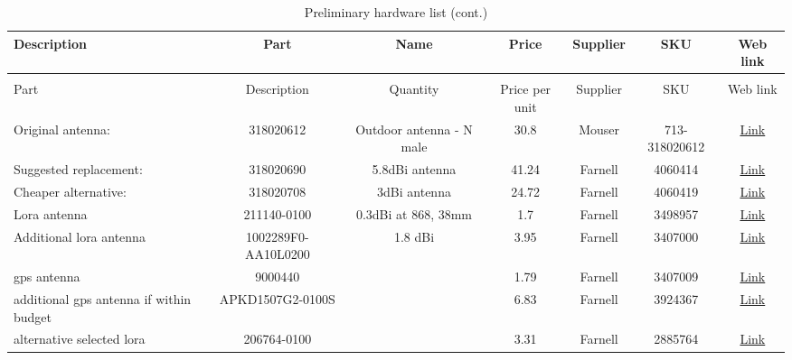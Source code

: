 \begin{appendices}
\begin{landscape}
\begin{xltabular}{\linewidth}{|cYccccc|}
    \end{xltabular}

    \begin{xltabular}{\linewidth}{|Ycccccc|}
        \caption{Antennae list} \label{table:antennaelist} \\
        \hline

        Description & Part & Name  & Price & Supplier & SKU & Web link \\
        \endfirsthead

        \caption{Preliminary hardware list (cont.)}\\
        \hline
        Part & Description & Quantity  & Price per unit & Supplier & SKU & Web link \\
        \endhead
        \endfoot

        \hline
        Original antenna: & 	318020612 & 	Outdoor antenna - N male & 	30.8 & 	Mouser	 & 713-318020612 & 	\href{https://www.mouser.co.uk/ProductDetail/Seeed-Studio/318020612?qs=TuK3vfAjtkUc5jgrDpnp\%252Bw\%3D\%3D}{Link \faExternalLink} \\
        \hline
        Suggested replacement:	 & 318020690	 & 5.8dBi antenna & 	41.24 & 	Farnell	 & 4060414 & 	\href{https://uk.farnell.com/seeed-studio/318020690/antenna-fiberglass-863-to-870mhz/dp/4060414}{Link \faExternalLink} \\
        \hline
        Cheaper alternative:	 & 318020708	 & 3dBi antenna	 & 24.72	 & Farnell	 & 4060419 & 	\href{https://uk.farnell.com/seeed-studio/318020708/antenna-fiberglass-860-to-930mhz/dp/4060419}{Link \faExternalLink} \\
        \hline
        Lora antenna	 & 211140-0100	 & 0.3dBi at 868, 38mm	 & 1.7	 & Farnell	 & 3498957 & 	\href{https://uk.farnell.com/molex/211140-0100/ism-antenna-902-928mhz-1dbi/dp/3498957?st=ism\%20antenna}{Link \faExternalLink} \\
        \hline
        Additional lora antenna	 & 1002289F0-AA10L0200 & 	1.8 dBi & 	3.95 & 	Farnell	 & 3407000 & 	\href{https://uk.farnell.com/avx/1002289f0-aa10l0200/fpc-embedded-antenna-2-69ghz-4/dp/3407000}{Link \faExternalLink} \\
        \hline
        gps antenna	 & 9000440	 &  & 	1.79	 & Farnell & 	3407009 & 	\href{https://uk.farnell.com/avx/9000440/pcb-antenna-1-593-1-61ghz-2-5dbi/dp/3407009}{Link \faExternalLink} \\
        \hline
        additional gps antenna if within budget	 & APKD1507G2-0100S	 & 	 & 6.83 & 	Farnell	 & 3924367 & 	\href{https://uk.farnell.com/abracon/apkd1507g2-0100s/patch-antenna-1-60538-1-59806ghz/dp/3924367}{Link \faExternalLink} \\
        \hline
        alternative selected lora	 & 206764-0100	  & & 	3.31	 & Farnell	 & 2885764	 & \href{https://uk.farnell.com/molex/206764-0100/omni-antenna-lin-902-928mhz-1/dp/2885764?st=ism\%20antenna}{Link \faExternalLink} \\
        \hline
    \end{xltabular}



\end{landscape}
\end{appendices}
